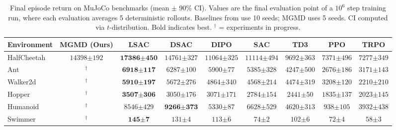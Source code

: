 \documentclass{article}
\theoremstyle{plain}
\theoremstyle{definition}
\theoremstyle{remark}
\begin{document}
\begin{table}[t]
  \caption{Final episode return on MuJoCo benchmarks (mean $\pm$ 90\% CI). Values are the final evaluation point of a $10^6$ step training run, where each evaluation averages 5 deterministic rollouts. Baselines from \citet{lsac2025} use 10 seeds; MGMD uses 5 seeds. CI computed via $t$-distribution. Bold indicates best. $^\dagger$ = experiments in progress.}
  \label{tab:main-results}
  \vskip 0.1in
  \begin{center}
  \begin{small}
  \begin{tabular}{lcccccccc}
    \toprule
    Environment & MGMD (Ours) & LSAC & DSAC & DIPO & SAC & TD3 & PPO & TRPO \\
    \midrule
    HalfCheetah & $14398{\scriptstyle\pm192}$ & $\mathbf{17386{\scriptstyle\pm450}}$ & $14761{\scriptstyle\pm327}$ & $11064{\scriptstyle\pm325}$ & $11114{\scriptstyle\pm494}$ & $9692{\scriptstyle\pm363}$ & $7371{\scriptstyle\pm496}$ & $7277{\scriptstyle\pm349}$ \\
    Ant & $^\dagger$ & $\mathbf{6918{\scriptstyle\pm117}}$ & $6287{\scriptstyle\pm100}$ & $5900{\scriptstyle\pm77}$ & $5385{\scriptstyle\pm328}$ & $4247{\scriptstyle\pm500}$ & $2676{\scriptstyle\pm186}$ & $3171{\scriptstyle\pm143}$ \\
    Walker2d & $^\dagger$ & $\mathbf{5910{\scriptstyle\pm197}}$ & $5672{\scriptstyle\pm276}$ & $4864{\scriptstyle\pm340}$ & $4568{\scriptstyle\pm214}$ & $4474{\scriptstyle\pm319}$ & $3208{\scriptstyle\pm120}$ & $2210{\scriptstyle\pm210}$ \\
    Hopper & $^\dagger$ & $\mathbf{3507{\scriptstyle\pm306}}$ & $3050{\scriptstyle\pm176}$ & $3071{\scriptstyle\pm171}$ & $2784{\scriptstyle\pm154}$ & $2441{\scriptstyle\pm50}$ & $1835{\scriptstyle\pm137}$ & $2023{\scriptstyle\pm145}$ \\
    Humanoid & $^\dagger$ & $8546{\scriptstyle\pm429}$ & $\mathbf{9266{\scriptstyle\pm373}}$ & $5330{\scriptstyle\pm87}$ & $6628{\scriptstyle\pm529}$ & $4620{\scriptstyle\pm313}$ & $938{\scriptstyle\pm105}$ & $3932{\scriptstyle\pm438}$ \\
    Swimmer & $^\dagger$ & $\mathbf{145{\scriptstyle\pm7}}$ & $131{\scriptstyle\pm4}$ & $113{\scriptstyle\pm6}$ & $74{\scriptstyle\pm2}$ & $102{\scriptstyle\pm6}$ & $72{\scriptstyle\pm4}$ & $58{\scriptstyle\pm3}$ \\
    \bottomrule
  \end{tabular}
  \end{small}
  \end{center}
  \vskip -0.1in
\end{table}
\end{document}
